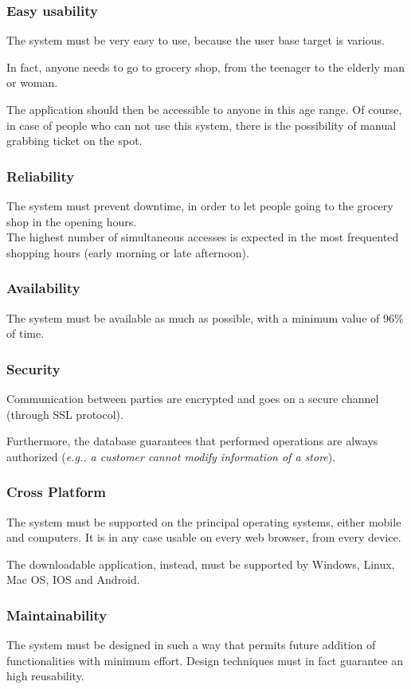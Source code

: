 \documentclass[table, 12pt]{article}
\begin{document}
\begin{flushleft}
    \subsubsection{Easy usability}
    The system must be very easy to use, because the user base target is various.

    In fact, anyone needs to go to grocery shop, from the teenager to the elderly man or woman.

    The application should then be accessible to anyone in this age range. Of course, in case of people who can not use this system, there is the possibility of manual grabbing ticket on the spot.
    \subsubsection{Reliability}
    The system must prevent downtime, in order to let people going to the grocery shop in the opening hours. \\
    The highest number of simultaneous accesses is expected in the most frequented shopping hours (early morning or late afternoon).
    \subsubsection{Availability}
    The system must be available as much as possible, with a minimum value of 96\% of time.
    \subsubsection{Security}
    Communication between parties are encrypted and goes on a secure channel (through SSL protocol).

    Furthermore, the database guarantees that performed operations are always authorized (\textit{e.g.. a customer cannot modify information of a store}).
    \subsubsection{Cross Platform}
    The system must be supported on the principal operating systems, either mobile and computers. It is in any case usable on every web browser, from every device.

    The downloadable application, instead, must be supported by Windows, Linux, Mac OS, IOS and Android.
    \subsubsection{Maintainability}
    The system must be designed in such a way that permits future addition of functionalities with minimum effort.
    Design techniques must in fact guarantee an high reusability.
    \newpage

\end{flushleft}
\end{document}

